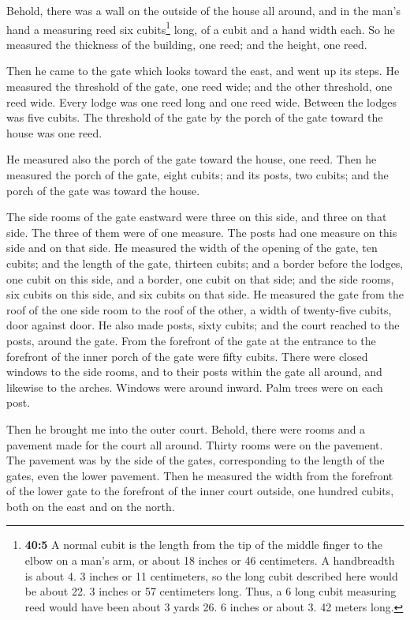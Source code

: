  Behold, there was a wall on the outside of the house all
around, and in the man's hand a measuring reed six cubits\footnote{\textbf{40:5}
  A normal cubit is the length from the tip of the middle finger to the
  elbow on a man's arm, or about 18 inches or 46 centimeters. A
  handbreadth is about 4. 3 inches or 11 centimeters, so the long cubit
  described here would be about 22. 3 inches or 57 centimeters long.
  Thus, a 6 long cubit measuring reed would have been about 3 yards 26.
  6 inches or about 3. 42 meters long.} long, of a cubit and a hand
width each. So he measured the thickness of the building, one reed; and
the height, one reed.

 Then he came to the gate which looks toward the east, and
went up its steps. He measured the threshold of the gate, one reed wide;
and the other threshold, one reed wide.  Every lodge was
one reed long and one reed wide. Between the lodges was five cubits. The
threshold of the gate by the porch of the gate toward the house was one
reed.

 He measured also the porch of the gate toward the house,
one reed.  Then he measured the porch of the gate, eight
cubits; and its posts, two cubits; and the porch of the gate was toward
the house.

 The side rooms of the gate eastward were three on this
side, and three on that side. The three of them were of one measure. The
posts had one measure on this side and on that side.  He
measured the width of the opening of the gate, ten cubits; and the
length of the gate, thirteen cubits;  and a border before
the lodges, one cubit on this side, and a border, one cubit on that
side; and the side rooms, six cubits on this side, and six cubits on
that side.  He measured the gate from the roof of the one
side room to the roof of the other, a width of twenty-five cubits, door
against door.  He also made posts, sixty cubits; and the
court reached to the posts, around the gate.  From the
forefront of the gate at the entrance to the forefront of the inner
porch of the gate were fifty cubits.  There were closed
windows to the side rooms, and to their posts within the gate all
around, and likewise to the arches. Windows were around inward. Palm
trees were on each post.

 Then he brought me into the outer court. Behold, there
were rooms and a pavement made for the court all around. Thirty rooms
were on the pavement.  The pavement was by the side of
the gates, corresponding to the length of the gates, even the lower
pavement.  Then he measured the width from the forefront
of the lower gate to the forefront of the inner court outside, one
hundred cubits, both on the east and on the north.

